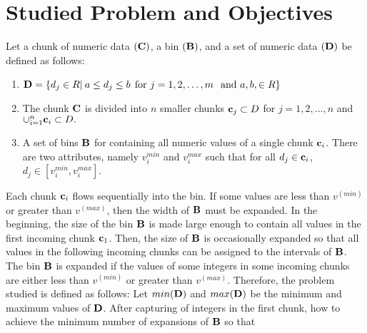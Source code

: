 \documentclass[lettersize,journal]{IEEEtran}
\begin{document}
\section{Studied Problem and Objectives}


Let a chunk of numeric data $({\bf C})$, a bin $({\bf B})$, and a set of numeric data $({\bf D})$ be defined as follows:

\begin{enumerate}
\item ${\bf D} = \{ d_j \in R| \: a \leq d_{j} \leq b \:\:{\rm for}\,\, j=1,2,\ldots,m$ 
$\,\, {\rm and}\,\, a, b, \in R\}$ 
\item The chunk ${\bf C}$ is divided into $n$ smaller chunks ${\bf c}_j \subset D$ for $j = 1,2,\ldots,n$ and $\cup_{i=1}^{n}{\bf c}_i \subset D.$  
\item A set of bins ${\bf B}$ for containing all numeric values of a single chunk ${\bf c}_i$. There are two attributes, namely $v_i^{min}$ and $v_i^{max}$ such that for all $d_j \in {\bf c}_i$, $d_j \in [v_i^{min},v_i^{max}].$   
\end{enumerate}
Each chunk ${\bf c}_{i}$ flows sequentially into the bin. If some values are less than $v^{(min)}$ or greater than $v^{(max)}$, then the width of ${\bf B}$ must be expanded. In the beginning, the size of the bin ${\bf B}$ is made large enough to contain all values in the first incoming chunk ${\bf c}_{1}$. Then, the size of ${\bf B}$ is occasionally expanded so that all values in the following incoming chunks can be assigned to the intervals of ${\bf B}$. The bin ${\bf B}$ is expanded if the values of some integers in some incoming chunks are either less than $v^{(min)}$ or greater 
than $v^{(max)}$. Therefore, the problem studied is defined as follows:  
Let $min({\bf D})$ and $max({\bf D})$ be the minimum and maximum values of ${\bf D}$. After capturing 
of integers in the first chunk, how to achieve the minimum number of expansions of ${\bf B}$ so that 
\end{document}
